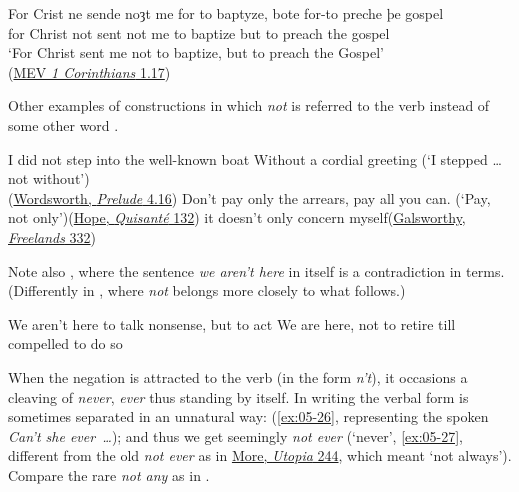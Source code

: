 \ea \label{ex:05-20}
\gll For Crist ne sende noȝt me {for to} baptyze, bote {for-to} preche þe gospel\\
 for Christ not sent not me to baptize but to preach the gospel\\
\glt `For Christ sent me not to baptize, but to preach the Gospel'\\\hfill(\href{https://archive.org/details/fourteenthcentur00pauerich/fourteenthcentur00pauerich/page/56/mode/2up?q=%22me+for+to+baptyze%22&view=theater}{MEV \textit{1 Corinthians} 1.17})
\z

Other examples of constructions in which \textit{not} is referred to the verb instead of some other word .%

\ea \label{ex:05-21}
\ea
I did not step into the well-known boat Without a cordial greeting (`I stepped {\dots} not without')\\\hfill(\href{https://en.wikisource.org/wiki/The_Prelude_(Wordsworth)/Book_IV}{Wordsworth, \textit{Prelude} 4.16})
\ex
Don't pay only the arrears, pay all you can. (`Pay, not only')\hfill(\href{https://archive.org/details/quisantanovel00hopegoog/page/n144/mode/2up?q=%22pay+only+the+arrears%22&view=theater}{Hope, \textit{Quisanté} 132})
\ex
it doesn't only concern myself\hfill(\href{https://archive.org/details/freelands00galsrich/page/288/mode/2up?q=%22concern+myself%22&view=theater}{Galsworthy, \textit{Freelands} 332})
\z
\z

Note also , where the sentence \textit{we aren't here} in itself is a contradiction in terms. (Differently in , where \textit{not} belongs more closely to what follows.)

\ea 
\ea \label{ex:05-24}
We aren't here to talk nonsense, but to act
\ex \label{ex:05-25}
We are here, not to retire till compelled to do so 
\z
\z

When the negation is attracted to the verb (in the form \textit{n't}), it occasions a cleaving of \textit{never}, \textit{ever} thus standing by itself. In writing the verbal form is sometimes separated in an unnatural way: (\ref{ex:05-26}, representing the spoken \textit{Can't she ever~{\dots}}); and thus we get seemingly \textit{not ever} (`never', \ref{ex:05-27}, different from the old \textit{not ever} as in \href{https://archive.org/details/utopiasirthomas00robigoog/page/n355/mode/2up?q=%22not+euer%22&view=theater}{More, \textit{Utopia} 244}, which meant `not always'). Compare the rare \il{English!not any@\textit{not any}}\textit{not any} as in \refp{ex:05-36}.

